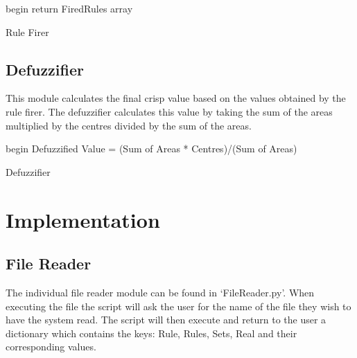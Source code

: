 \documentclass{article}
\begin{document}
\begin{algorithm}[H]
\SetAlgoLined
{}
 begin\;
 return FiredRules array
 \caption{Rule Firer}
\end{algorithm}

\subsection{Defuzzifier} \label {defuzz}
This module calculates the final crisp value based on the values obtained by the rule firer. The defuzzifier calculates this value by taking the sum of the areas multiplied by the centres divided by the sum of the areas.

\begin{algorithm}[H]
\SetAlgoLined
{}
 begin\;
Defuzzified Value = (Sum of Areas * Centres)/(Sum of Areas)
 \caption{Defuzzifier}
\end{algorithm}

\section{Implementation}

\subsection{File Reader}
The individual file reader module can be found in ‘FileReader.py’. When executing the file the script will ask the user for the name of the file they wish to have the system read.  The script will then execute and return to the user a dictionary which contains the keys: Rule, Rules, Sets, Real and their corresponding values.
\end{document}
